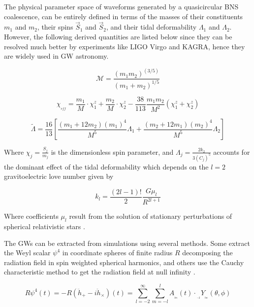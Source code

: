 \FloatBarrier

The physical parameter space of waveforms generated by a quasicircular BNS coalescence, can be entirely defined in terms of the masses of their constituents $m_1$ and $m_2$, their spins $\vec{S}_1$ and $\vec{S}_2$, and their tidal deformability $\Lambda_1$ and $\Lambda_2$\cite{Hinderer:2009ca}. However, the following derived quantities are listed below since they can be resolved much better by experiments like LIGO Virgo and KAGRA, hence they are widely used in GW astronomy.

\begin{equation}
\mathcal{M} = \frac{(m_1 m_2)^{(3/5)}}{(m_1 + m_2)^{1/5}}
\end{equation}

\begin{equation}\label{chieff}
\chi_{_{eff}} = \frac{m_1}{M}\cdot \chi_1^z + \frac{m_2}{M}\cdot \chi_2^z - \frac{38}{113} \frac{m_1 m_2}{M^2}(\chi_1^z + \chi_2^z)
\end{equation}


\begin{equation}
\tilde{\Lambda} = \frac{16}{13} \left[ \frac{(m_1 +12m_2)(m_1)^4}{M^5} \Lambda_1 + \frac{(m_2 +12m_1)(m_2)^4}{M^5} \Lambda_2 \right]
\end{equation}

Where $\chi_j = \frac{S_j}{m_j}$ is the dimensionless spin parameter, and $\Lambda_j = \frac{2k_2}{3(C_j)^5}$ accounts for the dominant effect of the tidal deformability  which depends on the $l=2$ gravitoelectric love number given by

\begin{equation}
k_l = \frac{(2l-1)!}{2}\frac{G \mu_l}{R^{2l+1}}
\end{equation}

Where coefficients $\mu_l$ result from the solution of stationary perturbations of spherical relativistic stars \cite{PhysRevD.80.084035,PhysRevD.80.084018,PhysRevD.77.021502,2020GReGr..52..108B}.

The GWs can be extracted from simulations using several methods. Some extract the Weyl scalar $\psi^4$ in coordinate spheres of finite radius $R$ \cite{Bishop:2016lgv,Thorne:1980ru} decomposing the radiation field in spin weighted spherical harmonics, and others use the Cauchy characteristic method to get the radiation field at null infinity \cite{Barkett:2019uae}.

\begin{equation}\label{pso}
R\psi^4(t) = - R(\ddot{h}_+ - i\ddot{h}_\times)(t) = \sum_{l=-2}^{\infty}  \sum_{m=-l}^{l} A_{_{_{lm}}}(t) \cdot {}_{_{_{-2}}}Y_{_{_{lm}}}(\theta, \phi)
\end{equation}

